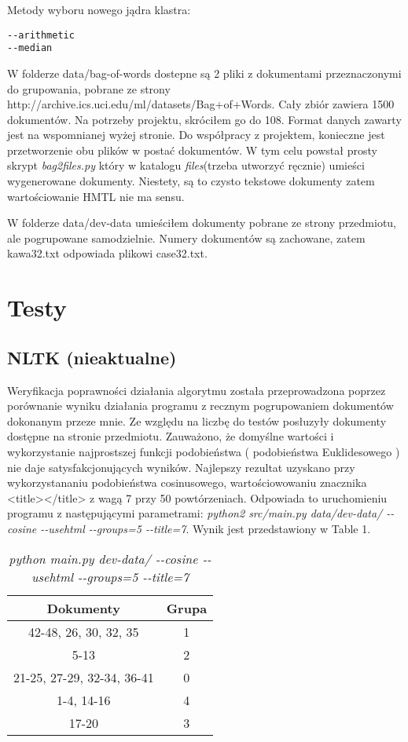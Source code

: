 \documentclass{article}
\begin{document}
Metody wyboru nowego jądra klastra:
\begin{description}
\item [\texttt{-{}-arithmetic}] 
\item [\texttt{-{}-median}] 
\end{description}
W folderze data/bag-of-words dostepne są 2 pliki z dokumentami przeznaczonymi do grupowania, pobrane ze strony http://archive.ics.uci.edu/ml/datasets/Bag+of+Words. Cały zbiór zawiera 1500 dokumentów. Na potrzeby projektu, skróciłem go do 108. Format danych zawarty jest na wspomnianej wyżej stronie. Do współpracy z projektem, konieczne jest przetworzenie obu plików w postać dokumentów. W tym celu powstał prosty skrypt \emph{bag2files.py} który w katalogu \emph{files}(trzeba utworzyć ręcznie) umieści wygenerowane dokumenty. Niestety, są to czysto tekstowe dokumenty zatem wartościowanie HMTL nie ma sensu.

W folderze data/dev-data umieściłem dokumenty pobrane ze strony przedmiotu, ale pogrupowane samodzielnie. Numery dokumentów są zachowane, zatem kawa32.txt odpowiada plikowi case32.txt.

\section{Testy}
\subsection{NLTK (nieaktualne)}
Weryfikacja poprawności działania algorytmu została przeprowadzona poprzez porównanie wyniku działania programu z recznym pogrupowaniem dokumentów dokonanym przeze mnie. Ze względu na liczbę do testów posłuzyły dokumenty dostępne na stronie przedmiotu. Zauważono, że domyślne wartości i wykorzystanie najprostszej funkcji podobieństwa ( podobieństwa Euklidesowego ) nie daje satysfakcjonujących wyników. Najlepszy rezultat uzyskano przy wykorzystananiu podobieństwa cosinusowego, wartościowowaniu znacznika <title></title> z wagą 7 przy 50 powtórzeniach. Odpowiada to uruchomieniu programu z następującymi parametrami: \emph{python2 src/main.py data/dev-data/ -{}-cosine -{}-usehtml -{}-groups=5  -{}-title=7}. Wynik jest przedstawiony w Table 1. 

\begin{table}[H]
\begin{center}
\begin{tabular}{ | c | c | }
\hline
Dokumenty & Grupa \\ \hline
42-48, 26, 30, 32, 35 & 1 \\ \hline
5-13 & 2 \\ \hline
21-25, 27-29, 32-34, 36-41 & 0 \\ \hline
1-4, 14-16 & 4 \\ \hline
17-20 & 3 \\ \hline
\end{tabular}
\end{center}
\caption{\emph{python main.py dev-data/ -{}-cosine -{}-usehtml -{}-groups=5  -{}-title=7}}
\end{table}
\end{document}
